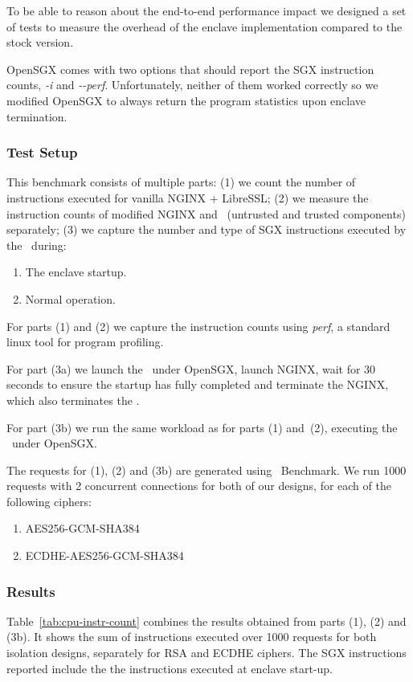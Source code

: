 \documentclass[../../../main.tex]{subfiles}
\begin{document}
\label{sec:cpu-instr-analysis}
To be able to reason about the end-to-end performance impact we designed a set
of tests to measure the overhead of the enclave implementation compared to the
stock version.


OpenSGX comes with two options that should report the SGX instruction counts,
\textit{-i} and \textit{-{}-perf}. Unfortunately, neither of them worked
correctly so we modified OpenSGX to always return the program statistics upon
enclave termination.

\subsubsection*{Test Setup}
This benchmark consists of multiple parts: (1) we count the number of
instructions executed for vanilla NGINX + LibreSSL; (2) we measure the
instruction counts of modified NGINX and \enclavemodel~(untrusted and trusted
components) separately; (3) we capture the number and type of SGX instructions
executed by the \enclaveprogram~during:
\begin{enumerate}[label=3\alph*)]
  \item The enclave startup.
  \item Normal operation.
\end{enumerate}

For parts (1) and (2) we capture the instruction counts using \textit{perf},
a standard linux tool for program profiling.

For part (3a) we launch the \enclaveprogram~under OpenSGX, launch NGINX, wait
for 30 seconds to ensure the startup has fully completed and terminate the
NGINX, which also terminates the \enclaveprogram.

For part (3b) we run the same workload as for parts (1) and~(2), executing
the \enclaveprogram~under OpenSGX.

The requests for (1), (2) and (3b) are generated using \Apache~Benchmark. We
run 1000 requests with 2 concurrent connections for both of our designs, for
each of the following ciphers:
\begin{enumerate}
  \item AES256-GCM-SHA384
  \item ECDHE-AES256-GCM-SHA384
\end{enumerate}

\subsubsection*{Results}
Table~\ref{tab:cpu-instr-count} combines the results obtained from parts (1),
(2) and (3b). It shows the sum of instructions executed over 1000 requests for
both isolation designs, separately for RSA and ECDHE ciphers. The SGX
instructions reported include the the instructions executed at enclave
start-up.
\end{document}
